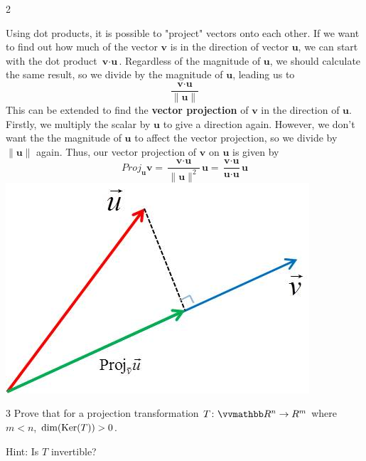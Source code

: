 \documentclass[11pt,fleqn]{article}
\begin{document}
\begin{center}
\begin{exr}{}{2}
\end{exr}

\begin{tcolorbox}[title={\fontsize{13pt}{13pt}\selectfont Projection}, enforce breakable, pad at break=4mm, colframe=darkcrimson!100,colback=black!1,width=.9\linewidth,sharp corners=north]\fontsize{11.5pt}{12pt}\selectfont 

Using dot products, it is possible to "project" vectors onto each other. If we want to find out how much of the vector $\textbf{v}$ is in the direction of vector $\textbf{u}$, we can start with the dot product $\textbf{v} \cdot \textbf{u}$. Regardless of the magnitude of $\textbf{u}$, we should calculate the same result, so we divide by the magnitude of $\textbf{u}$, leading us to
$$
\frac{\textbf{v} \cdot \textbf{u}}{\|\textbf{u}\|}
$$
This can be extended to find the \textbf{vector projection} of $\textbf{v}$ in the direction of $\textbf{u}$. Firstly, we multiply the scalar by $\textbf{u}$ to give a direction again. However, we don't want the the magnitude of $\textbf{u}$ to affect the vector projection, so we divide by $\|\textbf{u}\|$ again. Thus, our vector projection of $\textbf{v}$ on $\textbf{u}$ is given by
$$
\textit{Proj} _{\textbf{u}} \textbf{v} = \frac{\textbf{v} \cdot \textbf{u}}{\|\textbf{u}\|^2}\textbf{u} = \frac{\textbf{v} \cdot \textbf{u}}{\textbf{u} \cdot \textbf{u}}\textbf{u}
$$
\includegraphics{projection1.png}

\end{tcolorbox}

\begin{exr}{}{3}
Prove that for a projection transformation $T \colon \R^n \rightarrow R^m$ where $m<n$, $\dim (\operatorname{Ker} (T)) > 0$. \blni

Hint: Is $T$ invertible?
\end{exr}

\end{center}
\end{document}
